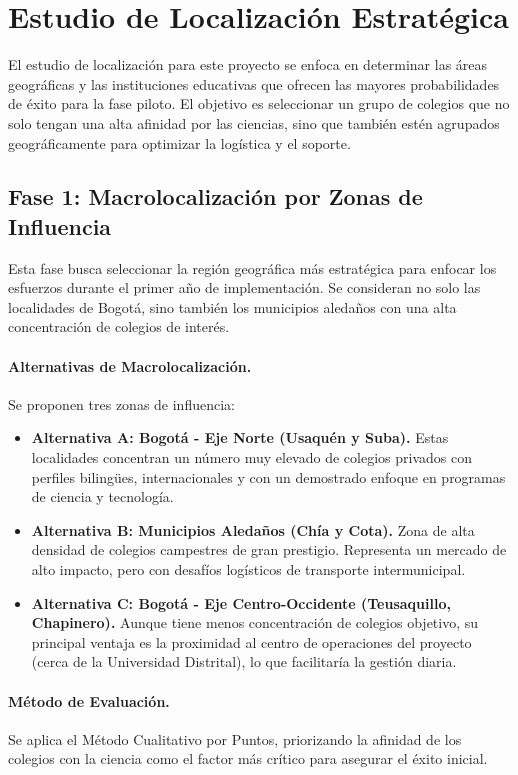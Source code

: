 \section*{Estudio de Localización Estratégica}

El estudio de localización para este proyecto se enfoca en determinar las áreas geográficas y las instituciones educativas que ofrecen las mayores probabilidades de éxito para la fase piloto. El objetivo es seleccionar un grupo de colegios que no solo tengan una alta afinidad por las ciencias, sino que también estén agrupados geográficamente para optimizar la logística y el soporte.

\subsection*{Fase 1: Macrolocalización por Zonas de Influencia}

Esta fase busca seleccionar la región geográfica más estratégica para enfocar los esfuerzos durante el primer año de implementación. Se consideran no solo las localidades de Bogotá, sino también los municipios aledaños con una alta concentración de colegios de interés.

\paragraph{Alternativas de Macrolocalización.} Se proponen tres zonas de influencia:
\begin{itemize}
    \item \textbf{Alternativa A: Bogotá - Eje Norte (Usaquén y Suba).} Estas localidades concentran un número muy elevado de colegios privados con perfiles bilingües, internacionales y con un demostrado enfoque en programas de ciencia y tecnología.
    \item \textbf{Alternativa B: Municipios Aledaños (Chía y Cota).} Zona de alta densidad de colegios campestres de gran prestigio. Representa un mercado de alto impacto, pero con desafíos logísticos de transporte intermunicipal.
    \item \textbf{Alternativa C: Bogotá - Eje Centro-Occidente (Teusaquillo, Chapinero).} Aunque tiene menos concentración de colegios objetivo, su principal ventaja es la proximidad al centro de operaciones del proyecto (cerca de la Universidad Distrital), lo que facilitaría la gestión diaria.
\end{itemize}

\paragraph{Método de Evaluación.} Se aplica el Método Cualitativo por Puntos, priorizando la afinidad de los colegios con la ciencia como el factor más crítico para asegurar el éxito inicial.

